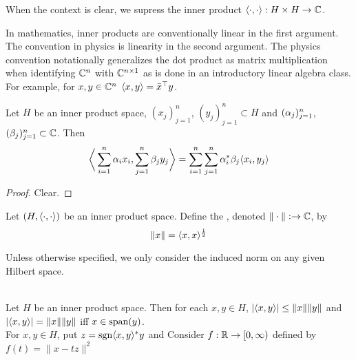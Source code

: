 \documentclass{book}
\begin{document}
	\begin{note}
		When the context is clear, we supress the inner product $\langle \cdot, \cdot \rangle: H \times H \rightarrow \mathbb{C}$.
	\end{note}
	
	\begin{note}
	In mathematics, inner products are conventionally linear in the first argument. The convention in physics is linearity in the second argument. The physics convention notationally generalizes the dot product as matrix multiplication when identifying $\mathbb{C}^n$ with $\mathbb{C}^{n \times 1}$ as is done in an introductory linear algebra class. For example, for $x,y \in \mathbb{C}^n$ $\langle x, y \rangle = \bar{x}^{\top} y$.
	\end{note}
	 
	\begin{ex} \lex{}
	Let $H$ be an inner product space, $(x_j)_{j =1}^n$, $(y_j)_{j =1}^n \subset H$ and $(\alpha_j)_{j=1}^n$, $(\beta_j)_{j=1}^n \subset \mathbb{C}$. Then $$\bigg \langle \sum_{i=1}^n \alpha_i x_i , \sum_{j=1}^n \beta_j y_j \bigg \rangle = \sum_{i=1}^n \sum_{j=1}^n \alpha_i^*\beta_j \langle x_i , y_j \rangle $$
\end{ex}

\begin{proof}
Clear.
\end{proof}

\begin{defn} \ld{}
Let $(H, \langle \cdot, \cdot \rangle)$ be an inner product space. Define the , denoted $\|\cdot \|: \rightarrow \mathbb{C}$, by $$\|x\| = \langle x, x\rangle^{\frac{1}{2}}$$
\end{defn}

\begin{note}
	Unless otherwise specified, we only consider the induced norm on any given Hilbert space.
\end{note}

\begin{ex} \lex{} \\
Let $H$ be an inner product space. Then for each $x,y \in H$, $| \langle x, y\rangle | \leq \|x\| \| y\|$ and $| \langle x, y\rangle | = \|x\| \| y\|$ iff $x \in \operatorname{span}(y)$. \\
 For $x, y \in H$, put $z = \operatorname{sgn}\langle x, y \rangle^*y$ and Consider $f: \mathbb{R} \rightarrow [0,\infty)$ defined by $f(t) = \|x - tz\|^2$
\end{ex}
\end{document}
